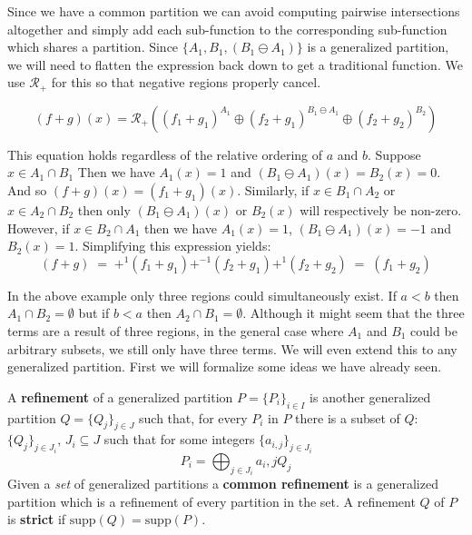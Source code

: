 Since we have a common partition we can avoid computing pairwise intersections altogether and simply add each 
sub-function to the corresponding sub-function which shares a partition.
Since $\{ A_1 , B_1, (B_1 \ominus A_1) \}$ is a generalized partition, we will need to flatten the expression back down
to get a traditional function.
We use $\mathcal{R}_+$ for this so that negative regions properly cancel. 

\begin{equation}
	(f+g)(x) = \mathcal{R}_+ \left( (f_1 + g_1)^{A_1} 
			\oplus (f_2 + g_1)^{B_1 \ominus A_1} 
			\oplus (f_2 + g_2)^{B_2} \right)
\end{equation}


This equation holds regardless of the relative ordering of $a$ and $b$.
Suppose $x \in A_1 \cap B_1$
Then we have $A_1(x)= 1$ and $(B_1 \ominus A_1)(x) = B_2(x) = 0$.
And so $(f+g)(x) = (f_1 + g_1)(x)$.
Similarly, if $x \in B_1 \cap A_2$ or $x \in A_2 \cap B_2$ then 
only $(B_1 \ominus A_1)(x)$ or $B_2(x)$ will respectively be non-zero.
However, if $x \in B_2 \cap A_1$ then we have $A_1(x) = 1$, $(B_1 \ominus A_1)(x) = -1$ and $B_2(x) = 1$.
Simplifying this expression yields:
\begin{equation}
	(f+g) \;=\; +^1 (f_1 + g_1) +^{-1} (f_2 + g_1) +^1 (f_2 + g_2) \;=\; (f_1 + g_2)
\end{equation}


In the above example only three regions could simultaneously exist.
If $a<b$ then $A_1 \cap B_2 = \emptyset$ but if $b<a$ then $A_2 \cap B_1 = \emptyset$.
Although it might seem that the three terms are a result of three regions, in the general case where 
$A_1$ and $B_1$ could be arbitrary subsets, we still only have three terms.
We will even extend this to any generalized partition.
First we will formalize some ideas we have already seen.


\begin{definition}
	A \textbf{refinement} of a generalized partition $P = \{P_i\}_{i \in I}$ is another generalized partition
	$Q = \{Q_j \}_{j \in J}$ such that, for every $P_i$ in $P$ there is a subset of $Q$: $\{ Q_{j} \}_{j \in J_i}$, 
	$J_i \subseteq J$ such that for some integers $\{a_{i,j}\}_{j \in J_i}$
	\begin{equation}
		P_i = \bigoplus_{j \in J_i} a_i,j Q_{j}
	\end{equation}
	Given a \emph{set} of generalized partitions a \textbf{common refinement} is a generalized partition which is a 
	refinement of every partition in the set. 
	A refinement $Q$ of $P$ is \textbf{strict} if $\text{supp}(Q) = \text{supp}(P)$.
\end{definition}



